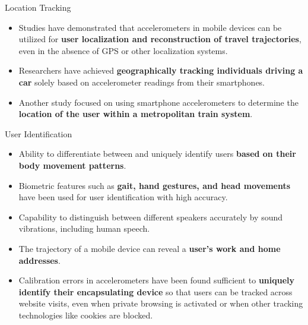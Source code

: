 \documentclass[ucs,9pt,usenames,dvipsnames]{beamer}
\begin{document}
\begin{frame}{Location Tracking}
\begin{itemize}
	\item Studies have demonstrated that accelerometers in mobile
	devices can be utilized for \textbf{user localization and reconstruction
	of travel trajectories}, even in the absence of GPS or other localization systems.
	\item Researchers have achieved \textbf{geographically tracking individuals driving a car} solely based on accelerometer readings from their smartphones.
	\item Another study focused on using smartphone accelerometers to determine the \textbf{location of the user within a metropolitan train system}. 
\end{itemize}
\end{frame}


\begin{frame}{User Identification}
\begin{itemize}
	\item Ability to differentiate between and uniquely identify users
	\textbf{based on their body movement patterns}. 
	\item Biometric features such as \textbf{gait, hand gestures, and head movements}  have been used for user identification with high
	accuracy. %
	\item Capability to distinguish between different speakers accurately by sound vibrations, including human speech.
	\item The trajectory of a mobile device can reveal a \textbf{user’s work and home addresses}. 
	\item Calibration errors in accelerometers %
	have been found sufficient to \textbf{uniquely	identify their encapsulating device} so that users can be tracked across website visits, even when private browsing is activated or when other tracking technologies like cookies are	blocked.
\end{itemize}
\end{frame}
\end{document}
